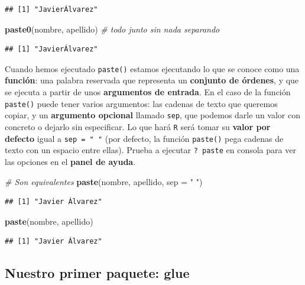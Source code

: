 \documentclass[11pt,]{book}
\newenvironment{Shaded}{\begin{snugshade}}{\end{snugshade}}
\newcommand{\CommentTok}[1]{\textcolor[rgb]{0.37,0.37,0.37}{\textit{#1}}}
\newcommand{\DataTypeTok}[1]{\textcolor[rgb]{0.27,0.27,0.27}{#1}}
\newcommand{\KeywordTok}[1]{\textcolor[rgb]{0.27,0.27,0.27}{\textbf{#1}}}
\newcommand{\NormalTok}[1]{#1}
\newcommand{\StringTok}[1]{\textcolor[rgb]{0.5,0.5,0.5}{#1}}
\begin{document}
\begin{verbatim}
## [1] "JavierÁlvarez"
\end{verbatim}

\begin{Shaded}
\begin{Highlighting}[]
\KeywordTok{paste0}\NormalTok{(nombre, apellido) }\CommentTok{# todo junto sin nada separando}
\end{Highlighting}
\end{Shaded}

\begin{verbatim}
## [1] "JavierÁlvarez"
\end{verbatim}

Cuando hemos ejecutado \texttt{paste()} estamos ejecutando lo que se conoce como una \textbf{función}: una palabra reservada que representa un \textbf{conjunto de órdenes}, y que se ejecuta a partir de unos \textbf{argumentos de entrada}. En el caso de la función \texttt{paste()} puede tener varios argumentos: las cadenas de texto que queremos copiar, y un \textbf{argumento opcional} llamado \texttt{sep}, que podemos darle un valor con concreto o dejarlo sin especificar. Lo que hará \texttt{R} será tomar su \textbf{valor por defecto} igual a \texttt{sep\ =\ "\ "} (por defecto, la función \texttt{paste()} pega cadenas de texto con un espacio entre ellas). Prueba a ejecutar \texttt{?\ paste} en consola para ver las opciones en el \textbf{panel de ayuda}.

\begin{Shaded}
\begin{Highlighting}[]
\CommentTok{# Son equivalentes}
\KeywordTok{paste}\NormalTok{(nombre, apellido, }\DataTypeTok{sep =} \StringTok{" "}\NormalTok{)}
\end{Highlighting}
\end{Shaded}

\begin{verbatim}
## [1] "Javier Álvarez"
\end{verbatim}

\begin{Shaded}
\begin{Highlighting}[]
\KeywordTok{paste}\NormalTok{(nombre, apellido)}
\end{Highlighting}
\end{Shaded}

\begin{verbatim}
## [1] "Javier Álvarez"
\end{verbatim}

\hypertarget{nuestro-primer-paquete-glue}{%
\subsection{Nuestro primer paquete: glue}\label{nuestro-primer-paquete-glue}}
\end{document}
